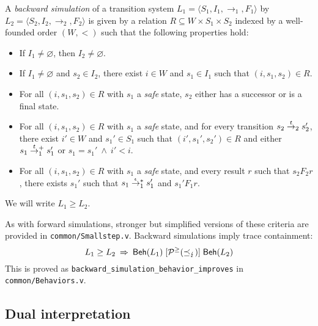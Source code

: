\documentclass[acmsmall,review,anonymous]{acmart}\settopmatter{printfolios=true,printccs=false,printacmref=false}
\begin{document}
\begin{definition} %
A \emph{backward simulation}
of a transition system
$L_1 = \langle S_1, I_1, {\rightarrow}_1, F_1 \rangle$
by
$L_2 = \langle S_2, I_2, {\rightarrow}_2, F_2 \rangle$
is given by a relation $R \subseteq W \times S_1 \times S_2$
indexed by a well-founded order $(W, {<})$
such that the following properties hold:
\begin{itemize}
  \item If $I_1 \ne \varnothing$, then $I_2 \ne \varnothing$.
  \item If $I_1 \ne \varnothing$ and $s_2 \in I_2$,
    there exist $i \in W$ and $s_1 \in I_1$
    such that $(i, s_1, s_2) \in R$.
  \item For all $(i, s_1, s_2) \in R$
    with $s_1$ a \emph{safe} state,
    $s_2$ either has a successor or
    is a final state.
  \item For all $(i, s_1, s_2) \in R$
    with $s_1$ a \emph{safe} state,
    and for every transition
    $s_2 \mathrel{\smash{\stackrel{t}{\rightarrow}}_2} s_2'$,
    there exist $i' \in W$ and $s_1' \in S_1$
    such that $(i', s_1', s_2') \in R$ and either
    $s_1 \mathrel{\smash{\stackrel{t}{\rightarrow}}_1^+} s_1'$ or
    $s_1 = s_1' \:\wedge\: i' < i$.
  \item For all $(i, s_1, s_2) \in R$
    with $s_1$ a \emph{safe} state,
    and every result $r$ such that $s_2 \mathrel{F_2} r$,
    there exists $s_1'$ such that
    $s_1 \mathrel{\smash{\stackrel{\epsilon}{\rightarrow}}_1^*} s_1'$ and
    $s_1' \mathrel{F_1} r$.
\end{itemize}
We will write $L_1 \ge L_2$.
\end{definition}

As with forward simulations,
stronger but simplified versions
of these criteria
are provided in \texttt{common/Smallstep.v}.
Backward simulations imply trace containment:
\[
  L_1 \ge L_2
  \: \Rightarrow \:
   \mathsf{Beh} (L_1) \mathrel{[{\mathcal{P}^\ge(\preceq_\lightning)}]}  \mathsf{Beh} (L_2)
\]
This is proved as \texttt{backward\_simulation\_behavior\_improves}
in \texttt{common/Behaviors.v}.


\subsection{Dual interpretation} %
\end{document}
